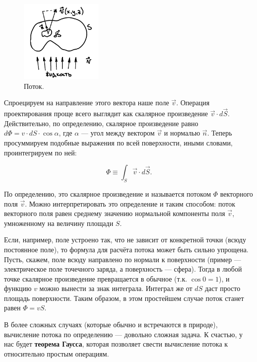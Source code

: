 \documentclass[11pt,a4paper]{article}
\numberwithin{equation}{section}
\begin{document}
\begin{figure}
  \vspace{-1cm}
  \begin{center}
    \includegraphics[width=4cm,height=4cm]{flux.pdf}
  \end{center}
  \vspace{-0.7cm}
  \caption{Поток.}
  \label{fig:flux}
\end{figure}

Спроецируем на направление этого вектора наше поле $\vec{v}$. Операция
проектирования проще всего выглядит как скалярное произведение
$\vec{v} \cdot d \vec{S}$. Действительно, по определению, скалярное
произведение равно $d\Phi = v \cdot dS \cdot \cos \alpha$, где $\alpha$ ---
угол между вектором $\vec{v}$ и нормалью $\vec{n}$. Теперь
просуммируем подобные выражения по всей поверхности, иными словами,
проинтегрируем по ней:

\begin{equation}
  \label{eq:def_flux}
  \Phi \equiv \int_S \vec{v} \cdot d \vec{S}.
\end{equation}

По определению, это скалярное произведение и называется потоком $\Phi$ 
векторного поля $\vec{v}$. Можно интерпретировать это определение и
таким способом: поток векторного поля равен среднему значению
нормальной компоненты поля $\vec{v}$, умноженному на величину площади
$S$. 

Если, например, поле устроено так, что не зависит от конкретной точки
(всюду постоянное поле), то формула для расчёта потока может быть
сильно упрощена. Пусть, скажем, поле всюду направлено по нормали к
поверхности (пример --- электрическое поле точечного заряда, а
поверхность --- сфера). Тогда в любой точке скалярное произведение
превращается в обычное (т.к. $\cos 0 = 1$), и функцию $v$ можно
вынести за знак интеграла. Интеграл же от $dS$ даст просто площадь
поверхности. Таким образом, в этом простейшем случае поток станет
равен $\Phi = vS$. 

В более сложных случаях (которые обычно и встречаются в природе),
вычисление потока по определению --- довольно сложная задача. К
счастью, у нас будет \textbf{теорема Гаусса}, которая позволяет свести
вычисление потока к относительно простым операциям. 
\end{document}
